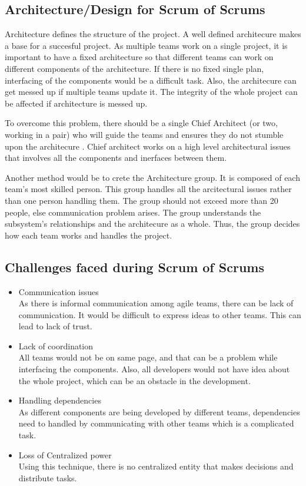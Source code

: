 \documentclass[sigconf]{acmart}
\begin{document}
\subsection{Architecture/Design for Scrum of Scrums }
Architecture defines the structure of the project. A well defined architecure makes a base for a succesful project. As multiple teams work on a single project, it is important to have a fixed architecture so that different teams can work on different components of the architecture. If there is no fixed single plan, interfacing of the components would be a difficult task. Also, the architecure can get messed up if multiple teams update it. The integrity of the whole project can be affected if architecture is messed up.


To overcome this problem, there should be a single Chief Architect (or two, working in a pair) who will guide the teams and ensures they do not stumble upon the architecure \cite{HenrikK}. Chief architect works on a high level architectural issues that involves all the components and inerfaces between them. 


Another method would be to crete the Architecture group. It is composed of each team's most skilled person. This group handles all the arcitectural issues rather than one person handling them. The group should not exceed more than 20 people, else communication problem arises. The group understands the subsystem's relationships and the architecure as a whole. Thus, the group decides how each team works and handles the project. 

\subsection{Challenges faced during Scrum of Scrums}
\begin{itemize}
\item Communication issues
\\As there is informal communication among agile teams, there can be lack of communication. It would be difficult to express ideas to other teams. This can lead to lack of trust.

\item Lack of coordination
\\All teams would not be on same page, and that can be a problem while interfacing the components. Also, all developers would not have idea about the whole project, which can be an obstacle in the development. 

\item Handling dependencies
\\As different components are being developed by different teams, dependencies need to handled by communicating with other teams which is a complicated task. 

\item Loss of Centralized power
\\Using this technique, there is no centralized entity that makes decisions and distribute tasks.
\end{itemize}
\end{document}
